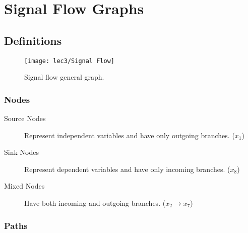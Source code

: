 \setchapterpreamble[u]{\margintoc}
\chapter[Signal Flow Graphs ($3^{rd}$ Lecture)]{Signal Flow Graphs}


\section{Definitions}

\begin{figure}[h]
	\texttt{[image: lec3/Signal Flow]}
	\caption{Signal flow general graph.}
\end{figure}

\vspace{-1.25mm}
\subsection[Nodes]{Nodes}

\begin{description}
	\item[Source Nodes]  Represent independent variables and have only outgoing branches. ($x_1$)
	\item[Sink Nodes]  Represent dependent variables and have only incoming branches. ($x_8$)
	\item[Mixed Nodes]  Have both incoming and outgoing branches. ($x_2 \to x_7$)
\end{description}

\vspace{-1.25mm}
\subsection[Paths]{Paths}


